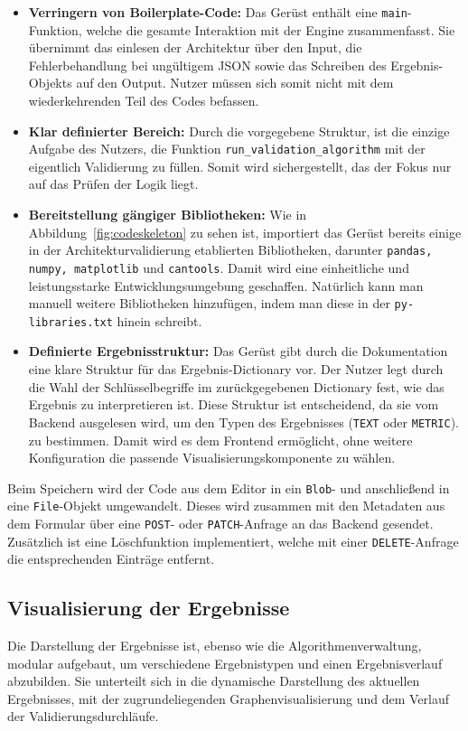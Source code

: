 \begin{itemize}
  \item \textbf{Verringern von Boilerplate-Code:} Das Gerüst enthält eine \texttt{main}-Funktion, welche die gesamte Interaktion mit der Engine zusammenfasst. Sie übernimmt das einlesen der Architektur über den Input, die Fehlerbehandlung bei ungültigem JSON sowie das Schreiben des Ergebnis-Objekts auf den Output. Nutzer müssen sich somit nicht mit dem wiederkehrenden Teil des Codes befassen.
  \item \textbf{Klar definierter Bereich:} Durch die vorgegebene Struktur, ist die einzige Aufgabe des Nutzers, die Funktion \texttt{run\_validation\_algorithm} mit der eigentlich Validierung zu füllen. Somit wird sichergestellt, das der Fokus nur auf das Prüfen der Logik liegt.
  \item \textbf{Bereitstellung gängiger Bibliotheken:} Wie in Abbildung~\ref{fig:codeskeleton} zu sehen ist, importiert das Gerüst bereits einige in der Architekturvalidierung etablierten Bibliotheken, darunter \texttt{pandas, numpy, matplotlib} und \texttt{cantools}. Damit wird eine einheitliche und leistungsstarke Entwicklungsumgebung geschaffen. Natürlich kann man manuell weitere Bibliotheken hinzufügen, indem man diese in der \texttt{py-libraries.txt} hinein schreibt.
  \item \textbf{Definierte Ergebnisstruktur:} Das Gerüst gibt durch die Dokumentation eine klare Struktur für das Ergebnis-Dictionary vor. Der Nutzer legt durch die Wahl der Schlüsselbegriffe im zurückgegebenen Dictionary fest, wie das Ergebnis zu interpretieren ist. Diese Struktur ist entscheidend, da sie vom Backend ausgelesen wird, um den Typen des Ergebnisses (\texttt{TEXT} oder \texttt{METRIC}). zu bestimmen. Damit wird es dem Frontend ermöglicht, ohne weitere Konfiguration die passende Visualisierungskomponente zu wählen.
\end{itemize}

Beim Speichern wird der Code aus dem Editor in ein \texttt{Blob}- und anschließend in eine \texttt{File}-Objekt umgewandelt. Dieses wird zusammen mit den Metadaten aus dem Formular über eine \texttt{POST}- oder \texttt{PATCH}-Anfrage an das Backend gesendet. Zusätzlich ist eine Löschfunktion implementiert, welche mit einer \texttt{DELETE}-Anfrage die entsprechenden Einträge entfernt.

\subsection{Visualisierung der Ergebnisse}
\label{subsec:visual}
Die Darstellung der Ergebnisse ist, ebenso wie die Algorithmenverwaltung, modular aufgebaut, um verschiedene Ergebnistypen und einen Ergebnisverlauf abzubilden. Sie unterteilt sich in die dynamische Darstellung des aktuellen Ergebnisses, mit der zugrundeliegenden Graphenvisualisierung und dem Verlauf der Validierungsdurchläufe.

